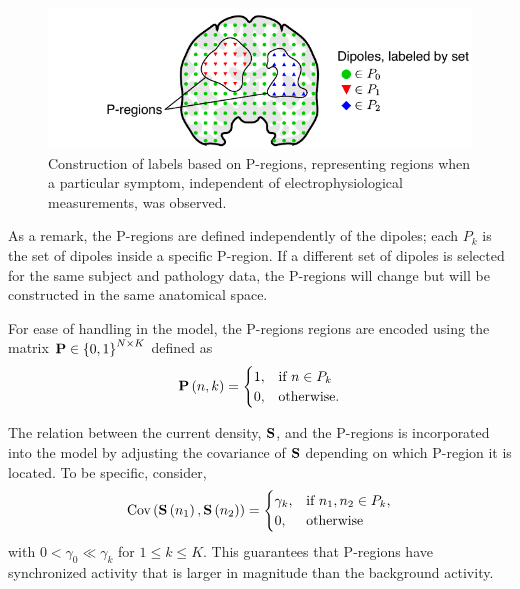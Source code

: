 \begin{figure}
    \centering 
    \includegraphics{./img/Pregions_pic.pdf}
    \caption{Construction of labels based on P-regions, representing regions when a particular symptom, independent of electrophysiological measurements, was observed.}
\end{figure}

As a remark, the P-regions are defined independently of the dipoles; each $P_k$ is the set of dipoles inside a specific P-region.
%
If a different set of dipoles is selected for the same subject and pathology data, the P-regions will change but will be constructed in the same anatomical space.

For ease of handling in the model, the P-regions regions are encoded using the matrix 
$\mathbf{P}\in \left\{ 0,1 \right\}^{N\times K}$ defined as
\begin{equation}
    \mathbf{P}\left( n,k \right) = \begin{cases}
        1, &\text{if } n \in P_k \\
        0, &\text{otherwise.}
    \end{cases}
\end{equation}



The relation between the current density, $\mathbf{S}$, and the P-regions is incorporated into the model by adjusting the covariance of $\mathbf{S}$ depending on which P-region it is located.
%
To be specific, consider,
\begin{equation}
    \text{Cov}\left( \mathbf{S}\left( n_1 \right), \mathbf{S}\left( n_2 \right) \right) = 
    \begin{cases}
        \gamma_k, & \text{if } n_1, n_2\in P_k, \\
        0, & \text{otherwise}
    \end{cases}
\end{equation}
with $0 < \gamma_0 \ll \gamma_k$ for $1\leq k \leq K$.
%
This guarantees that P-regions have synchronized activity that is larger in magnitude than the background activity.


